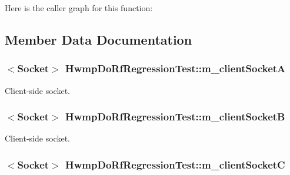Here is the caller graph for this function\+:




\subsection{Member Data Documentation}
\subsubsection[{\texorpdfstring{m\+\_\+client\+SocketA}{m_clientSocketA}}]{$<${\bf Socket}$>$ Hwmp\+Do\+Rf\+Regression\+Test\+::m\+\_\+client\+SocketA\hspace{0.3cm}{\ttfamily [private]}}\hypertarget{classHwmpDoRfRegressionTest_a92b62d465821ab3585dbc131a880d2d0}{}\label{classHwmpDoRfRegressionTest_a92b62d465821ab3585dbc131a880d2d0}


Client-\/side socket. 

\subsubsection[{\texorpdfstring{m\+\_\+client\+SocketB}{m_clientSocketB}}]{$<${\bf Socket}$>$ Hwmp\+Do\+Rf\+Regression\+Test\+::m\+\_\+client\+SocketB\hspace{0.3cm}{\ttfamily [private]}}\hypertarget{classHwmpDoRfRegressionTest_ae0bc2780d26fb6396f996966f1b6e57e}{}\label{classHwmpDoRfRegressionTest_ae0bc2780d26fb6396f996966f1b6e57e}


Client-\/side socket. 

\subsubsection[{\texorpdfstring{m\+\_\+client\+SocketC}{m_clientSocketC}}]{$<${\bf Socket}$>$ Hwmp\+Do\+Rf\+Regression\+Test\+::m\+\_\+client\+SocketC\hspace{0.3cm}{\ttfamily [private]}}\hypertarget{classHwmpDoRfRegressionTest_adf6b06c63c1c0fbca188cdd2320a3fa8}{}\label{classHwmpDoRfRegressionTest_adf6b06c63c1c0fbca188cdd2320a3fa8}


